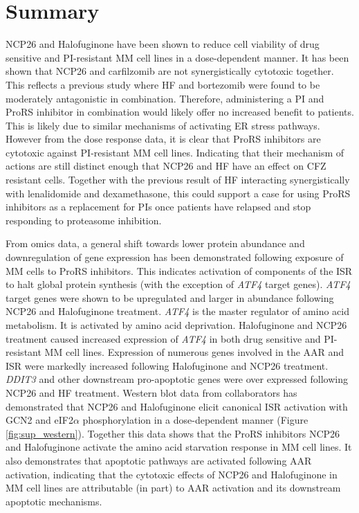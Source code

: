 \section{Summary}
NCP26 and Halofuginone have been shown to reduce cell viability of drug sensitive and PI-resistant MM cell lines in a dose-dependent manner.
It has been shown that NCP26 and carfilzomib are not synergistically cytotoxic together.
This reflects a previous study where HF and bortezomib were found to be moderately antagonistic in combination.
Therefore, administering a PI and ProRS inhibitor in combination would likely offer no increased benefit to patients.
This is likely due to similar mechanisms of activating ER stress pathways.
However from the dose response data, it is clear that ProRS inhibitors are cytotoxic against PI-resistant MM cell lines.
Indicating that their mechanism of actions are still distinct enough that NCP26 and HF have an effect on CFZ resistant cells.
Together with the previous result of HF interacting synergistically with lenalidomide and dexamethasone\cite{leiba2012halofuginone}, this could support a case for using ProRS inhibitors as a replacement for PIs once patients have relapsed and stop responding to proteasome inhibition.

From omics data, a general shift towards lower protein abundance and downregulation of gene expression has been demonstrated following exposure of MM cells to ProRS inhibitors.
This indicates activation of components of the ISR to halt global protein synthesis (with the exception of \textit{ATF4} target genes).
\textit{ATF4} target genes were shown to be upregulated and larger in abundance following NCP26 and Halofuginone treatment.
\textit{ATF4} is the master regulator of amino acid metabolism.
It is activated by amino acid deprivation.
Halofuginone and NCP26 treatment caused increased expression of \textit{ATF4} in both drug sensitive and PI-resistant MM cell lines.
Expression of numerous genes involved in the AAR and ISR were markedly increased following Halofuginone and NCP26 treatment.
\textit{DDIT3} and other downstream pro-apoptotic genes were over expressed following NCP26 and HF treatment.
Western blot data from collaborators has demonstrated that NCP26 and Halofuginone elicit canonical ISR activation with GCN2 and eIF2$\alpha$ phosphorylation in a dose-dependent manner (Figure \ref{fig:sup_western}).
Together this data shows that the ProRS inhibitors NCP26 and Halofuginone activate the amino acid starvation response in MM cell lines.
It also demonstrates that apoptotic pathways are activated following AAR activation, indicating that the cytotoxic effects of NCP26 and Halofuginone in MM cell lines are attributable (in part) to AAR activation and its downstream apoptotic mechanisms.